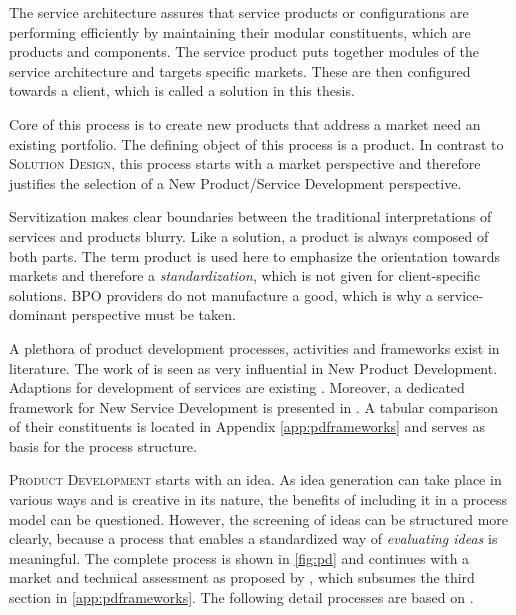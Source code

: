 	The service architecture assures that service products or configurations are performing efficiently by maintaining their modular constituents, which are products and components. The service product puts together modules of the service architecture and targets specific markets. These are then configured towards a client, which is called a solution in this thesis. 
	
	Core of this process is to create new products that address a market need \wrt an existing portfolio. The defining object of this process is a product. In contrast to \textsc{Solution Design}, this process starts with a market perspective and therefore justifies the selection of a New Product/Service Development perspective.  
	
	Servitization makes clear boundaries between the traditional interpretations of services and products blurry. Like a solution, a product is always composed of both parts. The term product is used here to emphasize the orientation towards markets and therefore a \textit{standardization}, which is not given for client-specific solutions. \acrshort{BPO} providers do not manufacture a good, which is why a service-dominant perspective must be taken.  
	
	A plethora of product development processes, activities and frameworks exist in literature. The work of  \cite{cooper1988new} is seen as very influential in New Product Development. Adaptions for development of services are existing \citep{Edgett_1996}. Moreover, a dedicated framework for New Service Development is presented in \citep{cowell1988new}. A tabular comparison of their constituents is located in Appendix \ref{app:pdframeworks} and serves as basis for the process structure. 
	
	 \textsc{Product Development} starts with an idea. As idea generation can take place in various ways and is creative in its nature, the benefits of including it in a process model can be questioned. However, the screening of ideas can be structured more clearly, because a process that enables a standardized way of \textit{evaluating ideas} is meaningful. The complete process is shown in \Fig \ref{fig:pd} and continues with a market and technical assessment as proposed by \citep{Edgett_1996}, which subsumes the third section in \ref{app:pdframeworks}. The following detail processes are based on \citep{cowell1988new}. 
	
